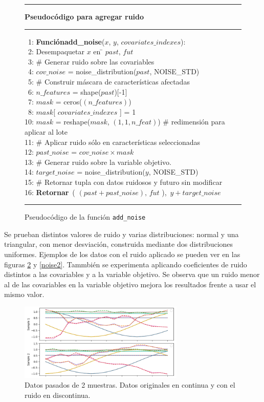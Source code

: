 \begin{figure}[H]
{\small
\hrule
{\bf\small Pseudocódigo para agregar ruido}
\hrule
\begin{center}
\begin{tabbing}
\ 1: {\bf Función}\={\bf add\_noise}($x$, $y$, $covariates\_indexes$): \\
\ 2: \> Desempaquetar $x$ en \= $past,\, fut$ \\
\ 3: \> \# Generar ruido sobre las covariables \\
\ 4: \> $cov\_noise$ = noise\_distribution($past$, NOISE\_STD) \\
\ 5: \> \# Construir máscara de características afectadas \\
\ 6: \> $n\_features$ = shape($past$)[-1] \\
\ 7: \> $mask$ = ceros($(n\_features)$) \\
\ 8: \> $mask$[ $covariates\_indexes$ ] = 1 \\
10: \> $mask$ = reshape($mask$, $(1,1,n\_feat)$)  \# redimensión para aplicar al lote \\
11: \> \# Aplicar ruido sólo en características seleccionadas \\
12: \> $past\_noise$ = $cov\_noise \times mask$ \\
13: \> \# Generar ruido sobre la variable objetivo. \\
14: \> $target\_noise$ = noise\_distribution($y$, NOISE\_STD) \\
15: \> \# Retornar tupla con datos ruidosos y futuro sin modificar \\
16: \> {\bf Retornar}\ ( $(past + past\_noise),\, fut$ ),\ $y + target\_noise$ \\
\end{tabbing}
\end{center}
}
\hrule
\caption{Pseudocódigo de la función \texttt{add\_noise}}
\label{add_noise}
\end{figure}


Se prueban distintos valores de ruido y varias distribuciones: normal y una triangular, con menor desviación, construida mediante dos distribuciones uniformes.
Ejemplos de los datos con el ruido aplicado se pueden ver en las figuras \ref{noise1} y \ref{noise2}. Tammbién se experimenta aplicando coeficientes de ruido distintos a las covariables 
y a la variable objetivo. Se observa que un ruido menor al de las covariables en la variable objetivo mejora los resultados frente a usar el mismo valor.

\begin{figure}[H]
    \centering
    \includegraphics[width=0.7\textwidth]{images/noise_past_data.png}
    \caption{Datos pasados de 2 muestras. Datos originales en continua y con el ruido en discontinua.}
    \label{noise1}
\end{figure}

